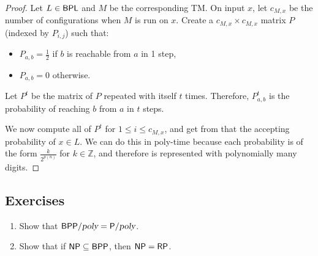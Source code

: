 \begin{proof}
Let $L \in {\ensuremath{\mathsf{BPL}}}$ and $M$ be the corresponding TM. On input $x$, let $c_{M, x}$ be the number of configurations when $M$ is run on $x$. Create a $c_{M, x} \times c_{M, x}$ matrix $P$ (indexed by $P_{i,j}$) such that:
\begin{itemize}
\item $P_{a, b} = \frac{1}{2}$ if $b$ is reachable from $a$ in 1 step,
\item $P_{a, b} = 0$ otherwise. 
\end{itemize}
Let $P^t$ be the matrix of $P$ repeated with itself $t$ times. Therefore, $P^t_{a, b}$ is the probability of reaching $b$ from $a$ in $t$ steps. 
\par We now compute all of $P^t$ for $1 \le i \le c_{M, x}$, and get from that the accepting probability of $x \in L$. We can do this in poly-time because each probability is of the form $\frac{k}{2^{p(n)}}$ for $k \in \mathbb{Z}$, and therefore is represented with polynomially many digits. 
\end{proof}

\subsection*{Exercises}
\newcommand{\BPPpoly}{\BPP/\poly}
\begin{enumerate}
\item Show that $\BPPpoly = \Ppoly$. %
\item Show that if ${\mathsf{NP}} \subseteq {\ensuremath{\mathsf{BPP}}}$, then ${\mathsf{NP}} = {\mathsf{RP}}$. %
\end{enumerate}